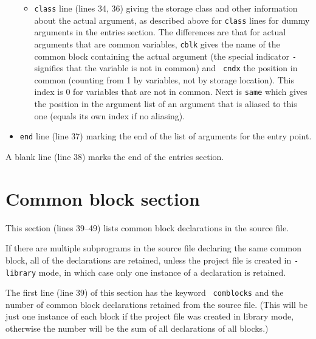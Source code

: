 \documentclass{article}
\begin{document}
\begin{itemize}
\begin{itemize}
    \item {\tt class} line (lines 34, 36) giving the storage class and
        other information about the actual argument, as described
        above for {\tt class} lines for dummy arguments in the entries
        section.  The differences are that for actual arguments that
        are common variables, {\tt cblk} gives the name of the common
        block containing the actual argument (the special indicator
        {\tt -} signifies that the variable is not in common) and {\tt
        cndx} the position in common (counting from 1 by variables,
        not by storage location).  This index is 0 for variables that
        are not in common.  Next is {\tt same} which gives the
        position in the argument list of an argument that is aliased
        to this one (equals its own index if no aliasing).

  \end{itemize}

  \item {\tt end} line (line 37) marking the end of the list of
	arguments for the entry point.

\end{itemize}

A blank line (line 38) marks the end of the entries section.


\section{Common block section}
This section (lines 39--49) lists common block declarations in the
source file.

If there are multiple subprograms in the source file declaring the
same common block, all of the declarations are retained, unless the
project file is created in {\tt -library} mode, in which case only one
instance of a declaration is retained.

The first line (line 39) of this section has the keyword {\tt
comblocks} and the  number of common block declarations retained
from the source file.  (This will be just one instance of
each block if the project file was created in library
mode, otherwise the number will be the sum of all
declarations of all blocks.)
\end{document}
